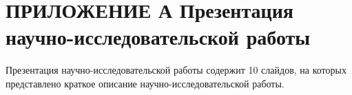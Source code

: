 \chapter*{ПРИЛОЖЕНИЕ А Презентация научно-исследовательской работы}
Презентация научно-исследовательской работы содержит 10 слайдов, на которых представлено краткое описание научно-исследовательской работы.